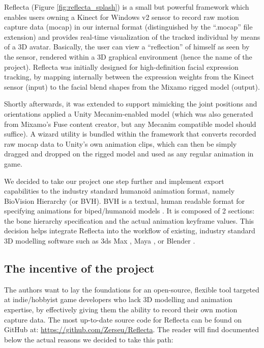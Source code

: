 \documentclass[a4paper, 12pt]{amsart}
\begin{document}
Reflecta (Figure \ref{fig:reflecta_splash}) is a small but powerful framework which enables users owning a Kinect for Windows v2 sensor to record raw motion capture data (mocap) in our internal format (distinguished by the ``.mocap'' file extension) and provides real-time visualization of the tracked individual by means of a 3D avatar. Basically, the user can view a ``reflection'' of himself as seen by the sensor, rendered within a 3D graphical environment (hence the name of the project). Reflecta was initially designed for high-definition facial expression tracking, by mapping internally between the expression weights from the Kinect sensor (input) to the facial blend shapes from the Mixamo rigged model (output).

Shortly afterwards, it was extended to support mimicking the joint positions and orientations applied a Unity Mecanim-enabled model (which was also generated from Mixamo's Fuse content creator, but any Mecanim compatible model should suffice). A wizard utility is bundled within the framework that converts recorded raw mocap data to Unity's own animation clips, which can then be simply dragged and dropped on the rigged model and used as any regular animation in game.

We decided to take our project one step further and implement export capabilities to the industry standard humanoid animation format, namely BioVision Hierarchy (or BVH). BVH is a textual, human readable format for specifying animations for biped/humanoid models \cite{bib_motion_capture_explained, bib_motion_capture_computer_animation, bib_motion_capture_editing}. It is composed of 2 sections: the bone hierarchy specification and the actual animation keyframe values. This decision helps integrate Reflecta into the workflow of existing, industry standard 3D modelling software such as 3ds Max \cite{bib_3ds_max}, Maya \cite{bib_maya}, or Blender \cite{bib_blender}.

\subsection{The incentive of the project}

The authors want to lay the foundations for an open-source, flexible tool targeted at indie/hobbyist game developers who lack 3D modelling and animation expertise, by effectively giving them the ability to record their own motion capture data. The most up-to-date source code for Reflecta can be found on GitHub at: \url{https://github.com/Zerseu/Reflecta}. The reader will find documented below the actual reasons we decided to take this path:
\end{document}
